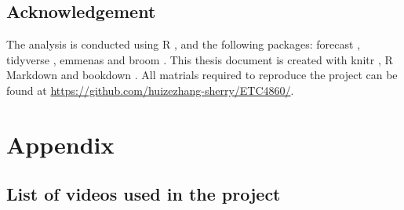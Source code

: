\documentclass{monashthesis}
\begin{document}
\hypertarget{acknowledgement}{%
\section{Acknowledgement}\label{acknowledgement}}

The analysis is conducted using R \autocite{Rlanguage}, and the following packages: forecast \autocite{forecast}, tidyverse \autocite{tidyverse}, emmenas \autocite{emmeans} and broom \autocite{broom}. This thesis document is created with knitr \autocite{knitr}, R Markdown \autocite{rmarkdown} and bookdown \autocite{bookdown}. All matrials required to reproduce the project can be found at \url{https://github.com/huizezhang-sherry/ETC4860/}.

\appendix

\hypertarget{appendix}{%
\chapter{Appendix}\label{appendix}}

\hypertarget{list-of-videos-used-in-the-project}{%
\section{List of videos used in the project}\label{list-of-videos-used-in-the-project}}
\end{document}
